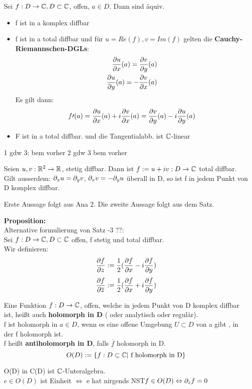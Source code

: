 \documentclass[11pt]{article}
\begin{document}
\begin{satz}
Sei $f:D\to \mathbb{C}, D\subset \mathbb{C}$, offen, $ a\in D$. Dann sind äquiv.
\begin{itemize}
	\item
	f ist in a komplex diffbar
	\item
	f ist in a total diffbar und für $u = Re(f), v = Im(f)$ gelten die 
	\textbf{Cauchy-Riemannschen-DGLs}:
	\begin{eqnarray}
	\frac{\partial u}{\partial x}(a) = \frac{\partial v}{\partial y}(a) \\
	\frac{\partial u}{\partial y}(a) = -\frac{\partial v}{\partial x}(a)
	\end{eqnarray}
	Es gilt dann:
	\[
	f\prime(a) = \frac{\partial u}{\partial x}(a) + i \frac{\partial v}{\partial x}(a)
	= \frac{\partial v}{\partial y}(a) -i \frac{\partial u}{\partial y}(a)
	\]
	\item
	F ist in a total diffbar. und die Tangentialabb. ist $\mathbb{C}$-linear
\end{itemize} 
\end{satz}

\begin{bew}
 1 gdw 3: bem vorher
 2 gdw 3 bem vorher 
\end{bew}

\begin{satz}
Seien $u,v:\mathbb{R}^2 \to \mathbb{R}$, stetig diffbar. Dann ist $f:=u+iv: D \to \mathbb{C}$ total 
diffbar.\\
Gilt ausserdem: $ \partial_x u= \partial_y v$, $\partial_x v = -\partial_y u$ überall in D, so ist 
f in jedem Punkt von D komplex diffbar.
\end{satz}
\begin{bemerkung}
Erste Aussage folgt aus Ana 2. Die zweite Aussage folgt aus dem Satz.
\end{bemerkung}

\textbf{Proposition:}\\
Alternative formulierung von Satz -3 ??:\\
Sei $ f:D\to \mathbb{C}, D \subset \mathbb{C}$ offen, f stetig und total diffbar.\\
Wir definieren:
\[
\frac{\partial f}{\partial z}:= \frac{1}{2} (\frac{\partial f}{\partial x}-i\frac{\partial f}{\partial y}) 
\]
\[
\frac{\partial f}{\partial \overline{z}}:= \frac{1}{2} (\frac{\partial f}{\partial x}+i\frac{\partial f}{\partial y})
\]


\begin{definition}
Eine Funktion $f:D\to \mathbb{C}$, offen, welche in jedem Punkt von D komplex diffbar ist, heißt auch \textbf{holomorph in D} ( oder analytisch oder regulär).\\
f ist holomorph in $ a\in D$, wenn es eine offene Umgebung $ U \subset D$ von a gibt , in der f holomorph ist.\\
f heißt \textbf{antiholomorph in D}, falls $\overline{f}$ holomorph in D.\\
\[
O(D):= \{f: D\subset \mathbb{C}|\text{ f holomorph in D}\}
\]
\end{definition}

\begin{bemerkung}
O(D) in C(D) ist $\mathbb{C}$-Unteralgebra.\\
$e \in O(D)$ ist Einheit $\Leftrightarrow$ e hat nirgends NST$ f \in O(D) \Leftrightarrow \partial_z f = 0$
\end{bemerkung}
\end{document}
